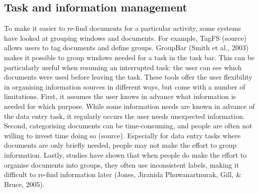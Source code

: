 \subsection{Task and information management}
To make it easier to re-find documents for a particular activity, some systems have looked at grouping windows and documents. For example, TagFS (source) allows users to tag documents and define groups. GroupBar (Smith et al., 2003) makes it possible to group windows needed for a task in the task bar. This can be particularly useful when resuming an interrupted task: the user can see which documents were used before leaving the task.
These tools offer the user flexibility in organising information sources in different ways, but come with a number of limitations. First, it assumes the user knows in advance what information is needed for which purpose. While some information needs are known in advance of the data entry task, it regularly occurs the user needs unexpected information. Second, categorising documents can be time-consuming, and people are often not willing to invest time doing so (source). Especially for data entry tasks where documents are only briefly needed, people may not make the effort to group information. Lastly, studies have shown that when people do make the effort to organise documents into groups, they often use inconsistent labels, making it difficult to re-find information later (Jones, Jiranida Phuwanartnurak, Gill, \& Bruce, 2005). 

